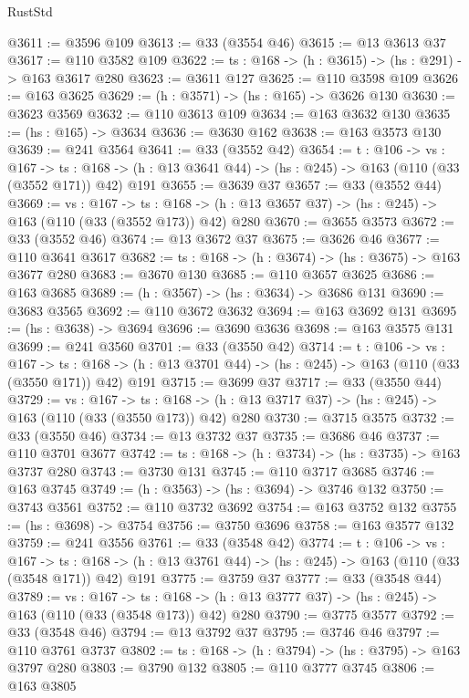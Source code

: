 \begin{lexlean}{RustStd}
\begin{coremodule}
{\begin{coremodule}
{{{{{@3611 := @3596 @109
@3613 := @33 (@3554 @46)
@3615 := @13 @3613 @37
@3617 := @110 @3582 @109
@3622 := {ts : @168} -> (h : @3615) -> (hs : @291) -> @163 @3617 @280
@3623 := @3611 @127
@3625 := @110 @3598 @109
@3626 := @163 @3625
@3629 := (h : @3571) -> (hs : @165) -> @3626 @130
@3630 := @3623 @3569
@3632 := @110 @3613 @109
@3634 := @163 @3632 @130
@3635 := (hs : @165) -> @3634
@3636 := @3630 @162
@3638 := @163 @3573 @130
@3639 := @241 @3564
@3641 := @33 (@3552 @42)
@3654 := {t : @106} ->
  {vs : @167} ->
  {ts : @168} -> (h : @13 @3641 @44) -> (hs : @245) -> @163 (@110 (@33 (@3552 @171)) @42) @191
@3655 := @3639 @37
@3657 := @33 (@3552 @44)
@3669 := {vs : @167} ->
  {ts : @168} -> (h : @13 @3657 @37) -> (hs : @245) -> @163 (@110 (@33 (@3552 @173)) @42) @280
@3670 := @3655 @3573
@3672 := @33 (@3552 @46)
@3674 := @13 @3672 @37
@3675 := @3626 @46
@3677 := @110 @3641 @3617
@3682 := {ts : @168} -> (h : @3674) -> (hs : @3675) -> @163 @3677 @280
@3683 := @3670 @130
@3685 := @110 @3657 @3625
@3686 := @163 @3685
@3689 := (h : @3567) -> (hs : @3634) -> @3686 @131
@3690 := @3683 @3565
@3692 := @110 @3672 @3632
@3694 := @163 @3692 @131
@3695 := (hs : @3638) -> @3694
@3696 := @3690 @3636
@3698 := @163 @3575 @131
@3699 := @241 @3560
@3701 := @33 (@3550 @42)
@3714 := {t : @106} ->
  {vs : @167} ->
  {ts : @168} -> (h : @13 @3701 @44) -> (hs : @245) -> @163 (@110 (@33 (@3550 @171)) @42) @191
@3715 := @3699 @37
@3717 := @33 (@3550 @44)
@3729 := {vs : @167} ->
  {ts : @168} -> (h : @13 @3717 @37) -> (hs : @245) -> @163 (@110 (@33 (@3550 @173)) @42) @280
@3730 := @3715 @3575
@3732 := @33 (@3550 @46)
@3734 := @13 @3732 @37
@3735 := @3686 @46
@3737 := @110 @3701 @3677
@3742 := {ts : @168} -> (h : @3734) -> (hs : @3735) -> @163 @3737 @280
@3743 := @3730 @131
@3745 := @110 @3717 @3685
@3746 := @163 @3745
@3749 := (h : @3563) -> (hs : @3694) -> @3746 @132
@3750 := @3743 @3561
@3752 := @110 @3732 @3692
@3754 := @163 @3752 @132
@3755 := (hs : @3698) -> @3754
@3756 := @3750 @3696
@3758 := @163 @3577 @132
@3759 := @241 @3556
@3761 := @33 (@3548 @42)
@3774 := {t : @106} ->
  {vs : @167} ->
  {ts : @168} -> (h : @13 @3761 @44) -> (hs : @245) -> @163 (@110 (@33 (@3548 @171)) @42) @191
@3775 := @3759 @37
@3777 := @33 (@3548 @44)
@3789 := {vs : @167} ->
  {ts : @168} -> (h : @13 @3777 @37) -> (hs : @245) -> @163 (@110 (@33 (@3548 @173)) @42) @280
@3790 := @3775 @3577
@3792 := @33 (@3548 @46)
@3794 := @13 @3792 @37
@3795 := @3746 @46
@3797 := @110 @3761 @3737
@3802 := {ts : @168} -> (h : @3794) -> (hs : @3795) -> @163 @3797 @280
@3803 := @3790 @132
@3805 := @110 @3777 @3745
@3806 := @163 @3805
}}}}}
\end{coremodule}}
\end{coremodule}
\end{lexlean}
